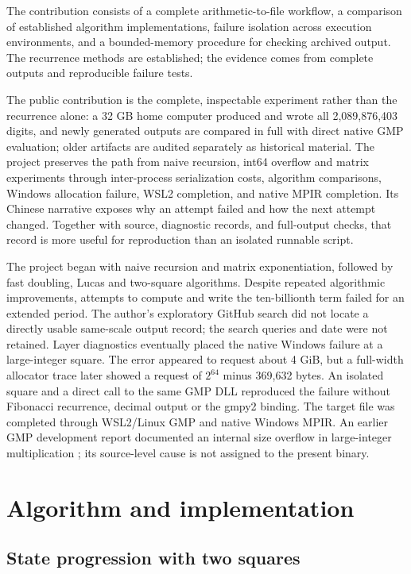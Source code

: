 \documentclass[11pt,a4paper]{article}
\begin{document}
The contribution consists of a complete arithmetic-to-file workflow, a comparison of established algorithm implementations, failure isolation across execution environments, and a bounded-memory procedure for checking archived output. The recurrence methods are established; the evidence comes from complete outputs and reproducible failure tests.

The public contribution is the complete, inspectable experiment rather than the recurrence alone: a 32 GB home computer produced and wrote all 2,089,876,403 digits, and newly generated outputs are compared in full with direct native GMP evaluation; older artifacts are audited separately as historical material. The project preserves the path from naive recursion, int64 overflow and matrix experiments through inter-process serialization costs, algorithm comparisons, Windows allocation failure, WSL2 completion, and native MPIR completion. Its Chinese narrative exposes why an attempt failed and how the next attempt changed. Together with source, diagnostic records, and full-output checks, that record is more useful for reproduction than an isolated runnable script.

The project began with naive recursion and matrix exponentiation, followed by fast doubling, Lucas and two-square algorithms. Despite repeated algorithmic improvements, attempts to compute and write the ten-billionth term failed for an extended period. The author's exploratory GitHub search did not locate a directly usable same-scale output record; the search queries and date were not retained. Layer diagnostics eventually placed the native Windows failure at a large-integer square. The error appeared to request about 4 GiB, but a full-width allocator trace later showed a request of $2^{64}$ minus 369,632 bytes. An isolated square and a direct call to the same GMP DLL reproduced the failure without Fibonacci recurrence, decimal output or the gmpy2 binding. The target file was completed through WSL2/Linux GMP and native Windows MPIR. An earlier GMP development report documented an internal size overflow in large-integer multiplication \cite{gmp_size_overflow}; its source-level cause is not assigned to the present binary.

\section{Algorithm and implementation}

\subsection{State progression with two squares}
\end{document}
